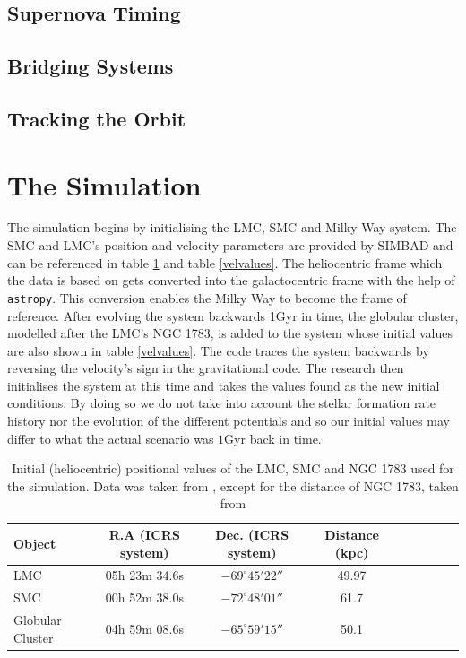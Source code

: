 \subsection{Supernova Timing}

\subsection{Bridging Systems}\label{Bridge}

\subsection{Tracking the Orbit}

\section{The Simulation}\label{TheSimulation}
\setcounter{figure}{0} 

The simulation begins by initialising the LMC, SMC and Milky Way system. The SMC and LMC's position and velocity parameters are provided by SIMBAD \citep{Simbad} and can be referenced in table \ref{TableLMCSMC} and table \ref{velvalues}. The heliocentric frame which the data is based on gets converted into the galactocentric frame with the help of \texttt{astropy}. This conversion enables the Milky Way to become the frame of reference. After evolving the system backwards 1Gyr in time, the globular cluster, modelled after the LMC's NGC 1783, is added to the system whose initial values are also shown in table \ref{velvalues}. The code traces the system backwards by reversing the velocity's sign in the gravitational code. The research then initialises the system at this time and takes the values found as the new initial conditions. By doing so we do not take into account the stellar formation rate history nor the evolution of the different potentials and so our initial values may differ to what the actual scenario was $1$Gyr back in time.

\begin{table}[htb]
\begin{center}
\begin{tabular}{lcccccccc}
\hline
Object & R.A (ICRS system) & Dec. (ICRS system) & Distance (kpc)  \\ \hline
LMC &  05h 23m 34.6s    &    $-69^{\circ} 45' 22''$      & 49.97   \\
SMC&	00h 52m 38.0s   &    $-72^{\circ} 48' 01''$  & 61.7  \\
Globular Cluster &   04h 59m 08.6s    &    $-65^{\circ} 59' 15''$  & 50.1 \\ \hline
\end{tabular}
\caption{Initial (heliocentric) positional values of the LMC, SMC and NGC 1783 used for the simulation. Data was taken from \cite{Simbad}, except for the distance of NGC 1783, taken from}
\label{TableLMCSMC}
\end{center}
\end{table}

